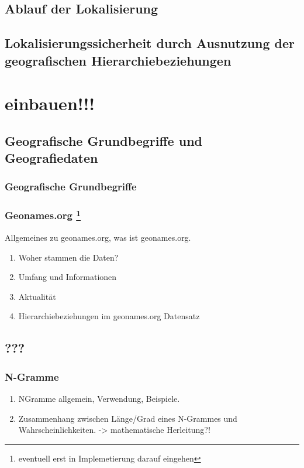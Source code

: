 	\subsection{Ablauf der Lokalisierung}
	
	\subsection{Lokalisierungssicherheit durch Ausnutzung der geografischen Hierarchiebeziehungen}


\section*{einbauen!!!}
\subsection{Geografische Grundbegriffe und Geografiedaten}

		\subsubsection{Geografische Grundbegriffe}

		\subsubsection{Geonames.org \footnote{eventuell erst in Implemetierung darauf eingehen} }
			Allgemeines zu geonames.org, was ist geonames.org. 
			\begin{enumerate}
				\item Woher stammen die Daten?
				\item Umfang und Informationen
				\item Aktualität
				\item Hierarchiebeziehungen im geonames.org Datensatz
			\end{enumerate}	

		\subsubsection{}	

	\subsection{???} 
		\subsubsection{N-Gramme}
			\begin{enumerate}
				\item NGramme allgemein, Verwendung, Beispiele. 
				\item {} Zusammenhang zwischen Länge/Grad eines N-Grammes und Wahrscheinlichkeiten. -> mathematische Herleitung?!
			\end{enumerate}





